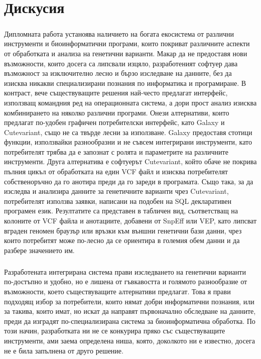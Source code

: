 \documentclass[pdftex,cyrillic,14pt,a4page,twoside,openright]{extreport}
\begin{document}
\chapter{Дискусия}
\paragraph{}
Дипломната работа устаноява наличието на богата екосистема от различни инструменти и биоинформатични програми, които покриват различните аспекти от обработката и анализа на генетични варианти. Макар да не предоставя нови възможности, които досега са липсвали изцяло, разработеният софтуер дава възможност за изключително лесно и бързо изследване на данните, без да изисква никакви специализирани познания по информатика и програмиране. В контраст, вече съществуващите решения най-често предлагат интерфейс, използващ командния ред на операционната система, а дори прост анализ изисква комбинирането на няколко различни програми. Онези алтернативи, които предлагат по-удобен графичен потребителски интерфейс, като Galaxy и Cutevariant, също не са твърде лесни за използване. Galaxy предоставя стотици функции, използвайки разнообразни и не съвсем интегрирани инструменти, като потребителят трябва да е запознат с ролята и параметрите на различните инструменти. Друга алтернатива е софтуерът Cutevariant, който обаче не покрива пълния цикъл от обработката на един VCF файл и изисква потребителят собственоръчно да го анотира преди да го зареди в програмата. Също така, за да изследва и анализира данните за генетичните варианти чрез Cutevariant, потребителят използва заявки, написани на подобен на SQL декларативен програмен език. Резултатите са представен в табличен вид, съответстващ на колоните от VCF файла и анотациите, добавени от SnpEff или VEP, като липсват вграден геномен браузър или връзки към външни генетични бази данни, чрез които потребитят може по-лесно да се ориентира в големия обем данни и да разбере значението им.

\paragraph{}
Разработената интегрирана система прави изследването на генетични варианти по-достъпно и удобно, но е лишена от гъвкавостта и голямото разнообразие от възможности, което съществуващите алтернативи предлагат. Това я прави подходящ избор за потребители, които нямат добри информатични познания, или за такива, които имат, но искат да направят първоначално обследване на данните, преди да изградят по-специализирана система за биоинформатична обработка. По този начин, разработката ни не се конкурира пряко със съществуващите инструменти, ами заема определена ниша, която, доколкото ни е известно, досега не е била запълнена от друго решение.
\end{document}
